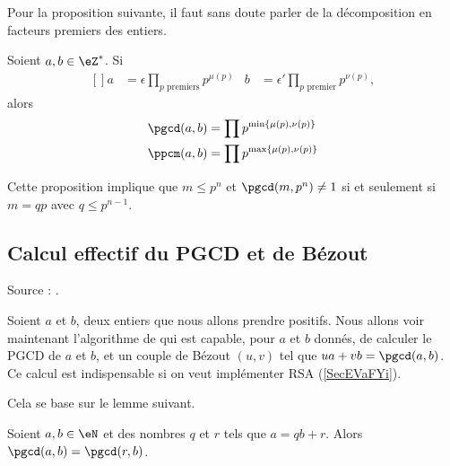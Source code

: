 \begin{probleme}
    Pour la proposition suivante, il faut sans doute parler de la décomposition en facteurs premiers des entiers.
\end{probleme}

\begin{proposition}
    Soient \( a,b\in\eZ^*\). Si
    \begin{equation}
        \begin{aligned}[]
            a&=\epsilon\prod_{ p\text{ premiers}}p^{\mu(p)}&b&=\epsilon'\prod_{ p\text{ premier}}p^{\nu(p)},
        \end{aligned}
    \end{equation}
    alors
    \begin{subequations}
        \begin{align}
            \pgcd(a,b)&=\prod p^{\min\{ \mu(p),\nu(p) \}}\\
            \ppcm(a,b)&=\prod p^{\max\{ \mu(p),\nu(p) \}}
        \end{align}
    \end{subequations}    
\end{proposition}

Cette proposition implique que \( m\leq p^n\) et \( \pgcd(m,p^n)\neq 1\) si et seulement si \( m=qp\) avec \( q\leq p^{n-1}\).

\subsection{Calcul effectif du PGCD et de Bézout}
\label{subSecIpmnhO}

Source : \cite{BezoutCos}.

Soient \( a\) et \( b\), deux entiers que nous allons prendre positifs. Nous allons voir maintenant l'algorithme de  qui est capable, pour \( a\) et \( b\) donnés, de calculer le PGCD de $a$ et $b$, et un couple de Bézout \( (u,v)\) tel que \( ua+vb=\pgcd(a,b)\). Ce calcul est indispensable si on veut implémenter RSA (\ref{SecEVaFYi}).

Cela se base sur le lemme suivant.

\begin{lemma}       \label{LemiVqita}
    Soient \( a,b\in \eN\) et des nombres \( q\) et \( r\) tels que \( a=qb+r\). Alors \( \pgcd(a,b)=\pgcd(r,b)\).
\end{lemma}

